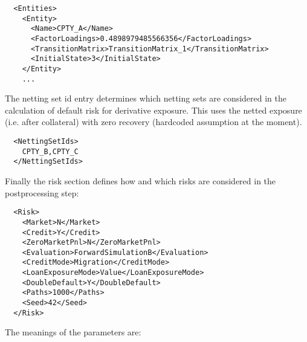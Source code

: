\documentclass[12pt, a4paper]{article}
\begin{document}
\begin{verbatim}
  <Entities>
    <Entity>
      <Name>CPTY_A</Name>
      <FactorLoadings>0.4898979485566356</FactorLoadings>
      <TransitionMatrix>TransitionMatrix_1</TransitionMatrix>
      <InitialState>3</InitialState>
    </Entity>
    ...
\end{verbatim}

The netting set id entry determines which netting sets are considered in the calculation of default risk for derivative
exposure. This uses the netted exposure (i.e. after collateral) with zero recovery (hardcoded assumption at the moment).

\begin{verbatim}
  <NettingSetIds>
    CPTY_B,CPTY_C
  </NettingSetIds>
\end{verbatim}

Finally the risk section defines how and which risks are considered in the postprocessing step:

\begin{verbatim}
  <Risk>
    <Market>N</Market>
    <Credit>Y</Credit>
    <ZeroMarketPnl>N</ZeroMarketPnl>
    <Evaluation>ForwardSimulationB</Evaluation>
    <CreditMode>Migration</CreditMode>
    <LoanExposureMode>Value</LoanExposureMode>
    <DoubleDefault>Y</DoubleDefault>
    <Paths>1000</Paths>
    <Seed>42</Seed>
  </Risk>
\end{verbatim}

The meanings of the parameters are:
\end{document}
